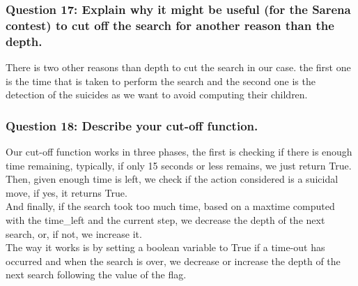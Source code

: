 \documentclass[a4paper,10pt]{article}
\begin{document}
				\subsubsection{Question 17: Explain why it might be useful (for the Sarena contest) to cut off the search for another reason than the depth.}
					There is two other reasons than depth to cut the search in our case. the first one is the time that is taken to perform the search and the second one is the detection of the suicides as we want to avoid computing their children.
				\subsubsection{Question 18: Describe your cut-off function.}
					Our cut-off function works in three phases, the first is checking if there is enough time remaining, typically, if only 15 seconds or less remains, we just return True.
					Then, given enough time is left, we check if the action considered is a suicidal move, if yes, it returns True.\\
					And finally, if the search took too much time, based on a maxtime computed with the time\_left and the current step, we decrease the depth of the next search, or, if not, we increase it.\\
					The way it works is by setting a boolean variable to True if a time-out has occurred and when the search is over, we decrease or increase the depth of the next search following the value of the flag.
\end{document}
